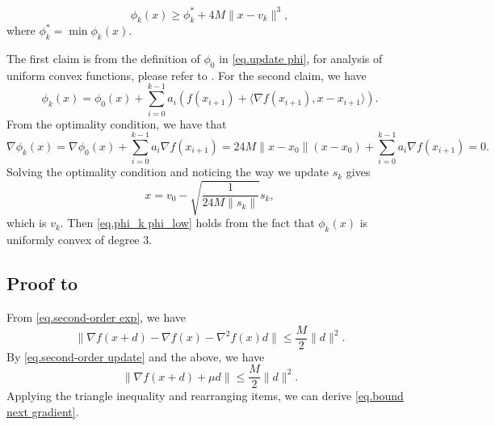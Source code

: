 \documentclass[moor,sglanonrev]{informs4}
\begin{document}
\begin{APPENDICES}
\begin{lemma}
\begin{enumerate}[label=(\roman*)]
\begin{equation}
                      \phi_k(x)\geq \phi_k^* + 4M\|x-v_k\|^3,
                  \end{equation}
                  where $\phi_k^* =\min \phi_k(x).$
        \end{enumerate}
    \end{lemma}
    The first claim is from the definition of $\phi_0$ in \eqref{eq.update phi}, for analysis of uniform convex functions, please refer to \cite[Section 4.2.2]{nesterov2018lectures}. For the second claim, we have
    \begin{equation}
        \label{eq.phi recursive}
        \phi_k(x) = \phi_0(x)+\sum_{i=0}^{k-1}a_i\left (f(x_{i+1})+\langle \nabla f(x_{i+1}),x-x_{i+1}\rangle \right).
    \end{equation}
    From the optimality condition, we have that
    \begin{equation*}
        \nabla \phi_k(x) = \nabla \phi_0(x)+ \sum_{i=0}^{k-1} a_i\nabla f(x_{i+1}) = 24M\|x-x_0\|(x-x_0)+\sum_{i=0}^{k-1} a_i\nabla f(x_{i+1}) =0.
    \end{equation*}
    Solving the optimality condition and noticing the way we update $s_k$ gives
    \begin{equation*}
        x = v_0 - \sqrt{\frac{1}{24M\|s_{k}\|}}s_{k},
    \end{equation*}
    which is $v_k$. Then \eqref{eq.phi_k phi_low} holds from the fact that $\phi_k(x)$ is uniformly convex of degree 3.
    \Halmos \endproof
    \subsection*{Proof to~}
    From \eqref{eq.second-order exp}, we have
    \begin{equation*}
        \|\nabla f(x+d)- \nabla f(x) -\nabla ^2 f(x) d\| \leq \frac{M}{2}\|d\|^2.
    \end{equation*}
    By \eqref{eq.second-order update} and the above, we have
    \begin{equation}\label{eq.bounded by squared step}
        \|\nabla f(x+d)+\mu d\| \leq \frac{M}{2}\|d\|^2.
    \end{equation}
    Applying the triangle inequality and rearranging items, we can derive \eqref{eq.bound next gradient}.
    \Halmos \endproof

\end{APPENDICES}
\end{document}
